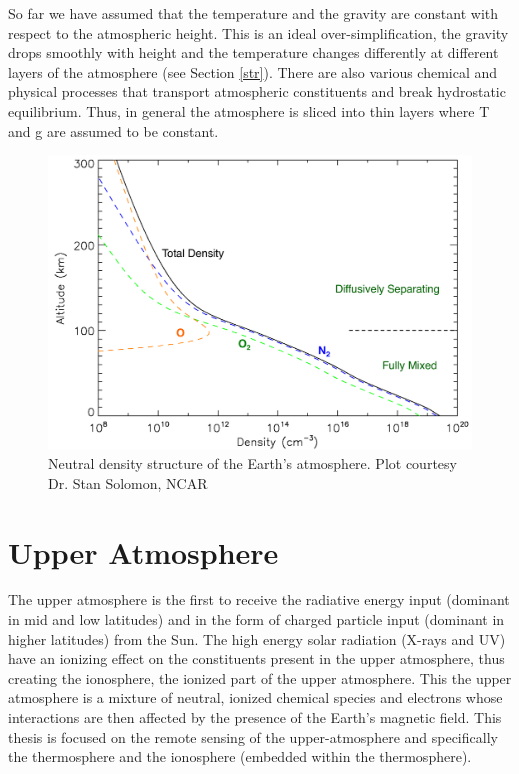 So far we have assumed that the temperature and the gravity are constant with respect to the atmospheric height. This is an ideal over-simplification, the gravity drops smoothly with height and the temperature changes differently at different layers of the atmosphere (see Section \ref{str}). There are also various chemical and physical processes that transport atmospheric constituents and break hydrostatic equilibrium. Thus, in general the atmosphere is sliced into thin layers where T and g are assumed to be constant. 
\begin{figure}[t]
	\centering\includegraphics[width=35pc]{ok_dens_str_neu.png}
	\caption{Neutral density structure of the Earth's atmosphere. Plot courtesy Dr. Stan Solomon, NCAR}
	\label{fig:neu_den}
\end{figure}
\section{Upper Atmosphere}
The upper atmosphere is the first to receive the radiative energy input (dominant in mid and low latitudes) and in the form of charged particle input (dominant in higher latitudes) from the Sun. The high energy solar radiation (X-rays and UV) have an ionizing effect on the constituents present in the upper atmosphere, thus creating the ionosphere, the ionized part of the upper atmosphere. This the upper atmosphere is a mixture of neutral, ionized chemical species and electrons whose interactions are then affected by the presence of the Earth’s magnetic field. This thesis is focused on the remote sensing of the upper-atmosphere and specifically the thermosphere and the ionosphere (embedded within the thermosphere).

